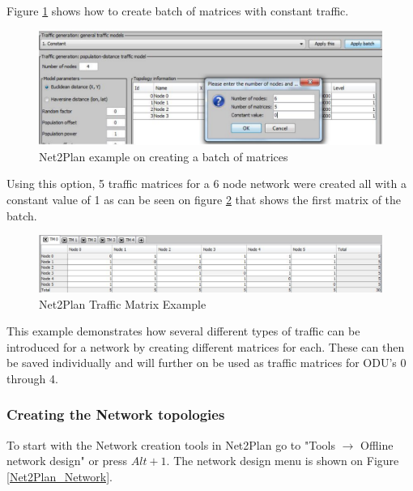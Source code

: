 	Figure \ref{TrafficMatrixCreation} shows how to create batch of matrices with constant traffic.
	
	\begin{figure}[h!]
		\centering
		\includegraphics[width = 13cm]{TrafficMatrixCreation.pdf}
		\caption{Net2Plan example on creating a batch of matrices }
		\label{TrafficMatrixCreation}
	\end{figure} 	
	
	Using this option, 5 traffic matrices for a 6 node network were created all with a constant value of 1 as can be seen on figure \ref{Net2Plan_matrix} that shows the first matrix of the batch.

	\begin{figure}[h!]
		\centering
		\includegraphics[width = 13cm]{Net2Plan_matrix.pdf}
		\caption{Net2Plan Traffic Matrix Example}
		\label{Net2Plan_matrix}
	\end{figure}
	
	This example demonstrates how several different types of traffic can be introduced for a network by creating different matrices for each. These can then be saved individually and will further on be used as traffic matrices for ODU's 0 through 4.
	
	\newpage
		
	\subsubsection{Creating the Network topologies} \label{Creating the Network topologies}
	To start with the Network creation tools in Net2Plan go to "Tools $\rightarrow$ Offline network design" or press $Alt+1$. The network design menu is shown on Figure \ref{Net2Plan_Network}.
	

